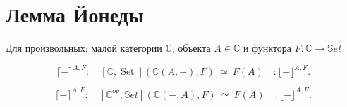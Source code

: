 \documentclass[
  russian,
  aspectratio=169,
  xcolor={svgnames},
  hyperref={colorlinks,citecolor=DeepPink4}]{beamer}
\begin{document}
\section{Лемма Йонеды}

\begin{frame}[fragile]
Для произвольных: малой категории $\mathbb{C}$, объекта $A\in\mathbb{C}$ и функтора $F: \mathbb{C} \rightarrow \mathbb{S}et$

\begin{lemma}
$$
\lceil- \rceil^{A, F}:\quad
[\mathbb{C}, \operatorname{Set}](\mathbb{C}(A,-), F) \ \simeq\ F(A)
\quad:\lfloor-\rfloor^{A, F}.
$$
\end{lemma}

\begin{lemma}
$$
\lceil- \rceil^{A, F} :\quad
[\mathbb{C}^{op}, \mathbb{S}et](\mathbb{C}(-,A), F) \ \simeq\  F(A)
\quad:\lfloor-\rfloor^{A, F}.
$$
\end{lemma}
\end{frame}
\end{document}
